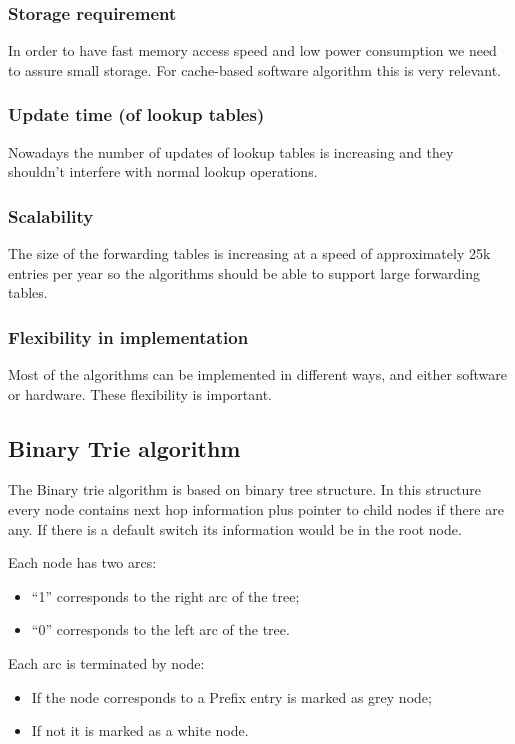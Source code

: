 \documentclass[]{report}
\begin{document}
\subsubsection{Storage requirement}
	In order to have fast memory access speed and low power consumption we need to assure small storage. For cache-based software algorithm this is very relevant.
\subsubsection{Update time (of lookup tables)}
	Nowadays the number of updates of lookup tables is increasing and they shouldn’t interfere with normal lookup operations.     
\subsubsection{Scalability}
	The size of the forwarding tables is increasing at a speed of approximately 25k entries per year so the algorithms should be able to support large forwarding tables. 
\subsubsection{Flexibility in implementation}
	Most of the algorithms can be implemented in different ways, and either software or hardware. These flexibility is important.


\subsection{Binary Trie algorithm}
	The Binary trie algorithm is based on binary tree structure. In this structure every node contains next hop information plus pointer to child nodes if there are any. If there is a default switch its information would be in the root node. 
	
Each node has two arcs:
\begin{itemize}
\item “1” corresponds to the right arc of the tree;
\item “0” corresponds to the left arc of the tree.
\end{itemize}
	
Each arc is terminated by node:
\begin{itemize}
\item If the node corresponds to a Prefix entry is marked as grey node;
\item If not it is marked as a white node.
\end{itemize}
\end{document}

